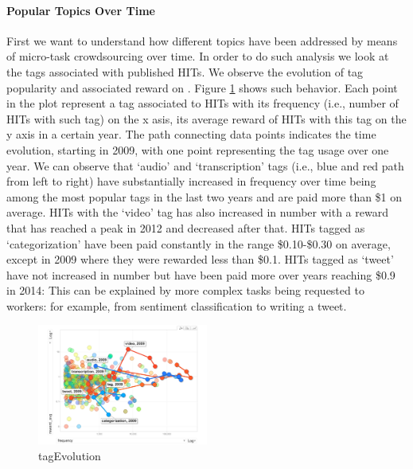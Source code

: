 \paragraph{Popular Topics  Over Time}
First we want to understand how different topics have been addressed by means of micro-task crowdsourcing over time.
In order to do such analysis we look at the tags associated with published HITs. We observe the evolution of tag popularity and associated reward on \amt{}. 
Figure \ref{fig:tagEvolution} shows such behavior. Each point in the plot represent a tag associated to HITs with its frequency (i.e., number of HITs with such tag) on the x asis, its average reward of HITs with this tag on the y axis in a certain year. The path connecting data points indicates the time evolution, starting in 2009, with one point representing the tag usage over one year.
We can observe that `audio' and `transcription' tags (i.e., blue and red path from left to right) have substantially increased in frequency over time being among the most popular tags in the last two years and are paid more than \$1 on average.
HITs with the `video' tag has also increased in number with a reward that has reached a peak in 2012 and decreased after that.
HITs tagged as `categorization' have been paid constantly in the range \$0.10-\$0.30 on average, except in 2009 where they were rewarded less than \$0.1.
HITs tagged as `tweet' have not increased in number but have been paid more over years reaching \$0.9 in 2014: This can be explained by more complex tasks being requested to workers: for example, from sentiment classification to writing a tweet.

\begin{figure}[htbp]
	\centering
		\includegraphics[width=0.5\textwidth]{figures/tagEvolution}
	\caption{tagEvolution}
	\label{fig:tagEvolution}
\end{figure}

